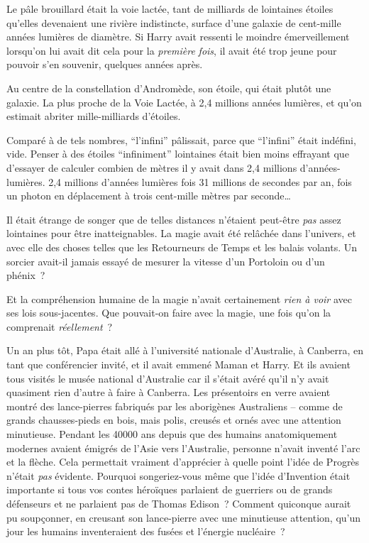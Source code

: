 Le pâle brouillard était la voie lactée, tant de milliards de lointaines étoiles qu'elles devenaient une rivière indistincte, surface d'une galaxie de cent-mille années lumières de diamètre. Si Harry avait ressenti le moindre émerveillement lorsqu'on lui avait dit cela pour la \emph{première} \emph{fois}, il avait été trop jeune pour pouvoir s'en souvenir, quelques années après.

Au centre de la constellation d'Andromède, son étoile, qui était plutôt une galaxie. La plus proche de la Voie Lactée, à 2,4 millions années lumières, et qu'on estimait abriter mille-milliards d'étoiles.

Comparé à de tels nombres, “l'infini” pâlissait, parce que “l'infini” était indéfini, vide. Penser à des étoiles “infiniment” lointaines était bien moins effrayant que d'essayer de calculer combien de mètres il y avait dans 2,4 millions d'années-lumières. 2,4 millions d'années lumières fois 31 millions de secondes par an, fois un photon en déplacement à trois cent-mille mètres par seconde…

Il était étrange de songer que de telles distances n'étaient peut-être \emph{pas} assez lointaines pour être inatteignables. La magie avait été relâchée dans l'univers, et avec elle des choses telles que les Retourneurs de Temps et les balais volants. Un sorcier avait-il jamais essayé de mesurer la vitesse d'un Portoloin ou d'un phénix~?

Et la compréhension humaine de la magie n'avait certainement \emph{rien à voir} avec ses lois sous-jacentes. Que pouvait-on faire avec la magie, une fois qu'on la comprenait \emph{réellement}~?

Un an plus tôt, Papa était allé à l'université nationale d'Australie, à Canberra, en tant que conférencier invité, et il avait emmené Maman et Harry. Et ils avaient tous visités le musée national d'Australie car il s'était avéré qu'il n'y avait quasiment rien d'autre à faire à Canberra. Les présentoirs en verre avaient montré des lance-pierres fabriqués par les aborigènes Australiens -- comme de grands chausses-pieds en bois, mais polis, creusés et ornés avec une attention minutieuse. Pendant les 40000 ans depuis que des humains anatomiquement modernes avaient émigrés de l'Asie vers l'Australie, personne n'avait inventé l'arc et la flèche. Cela permettait vraiment d'apprécier à quelle point l'idée de Progrès n'était \emph{pas} évidente. Pourquoi songeriez-vous même que l'idée d'Invention était importante si tous vos contes héroïques parlaient de guerriers ou de grands défenseurs et ne parlaient pas de Thomas Edison~? Comment quiconque aurait pu soupçonner, en creusant son lance-pierre avec une minutieuse attention, qu'un jour les humains inventeraient des fusées et l'énergie nucléaire~?

